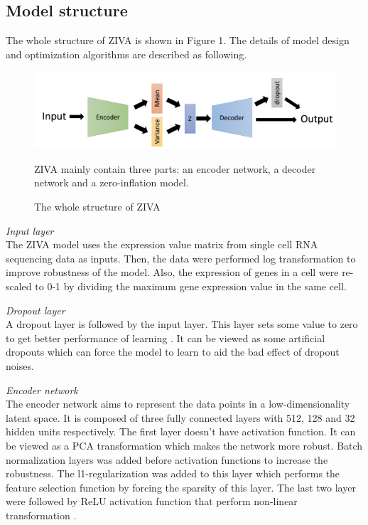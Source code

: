 \subsection{Model structure}
The whole structure of ZIVA is shown in Figure 1. The details of model design and optimization algorithms are described as following. 
\begin{figure}
    \centering
    \includegraphics[width=1\textwidth]{figures/myfigures/ZIVA.png}
    \caption{The whole structure of ZIVA}\label{F:test-a}
    ZIVA mainly contain three parts: an encoder network, a decoder network and a zero-inflation model. 
\end{figure}

\vspace{0.5cm}
\noindent\emph{Input layer} \\ The ZIVA model uses the expression value matrix from single cell RNA sequencing data as inputs. Then, the data were performed log transformation to improve robustness of the model.  Also, the expression of genes in a cell were re-scaled to 0-1 by dividing the maximum gene expression value in the same cell. 

\vspace{0.5cm}
\noindent\emph{Dropout layer} \\ A dropout layer \cite{baldi2013understanding} is followed by the input layer. This layer sets some value to zero to get better performance of learning \cite{vincent2008extracting}. It can be viewed as some artificial dropouts which can force the model to learn to aid the bad effect of dropout noises. 

\vspace{0.5cm}
\noindent\emph{Encoder network} \\
The encoder network aims to represent the data points in a low-dimensionality latent space. It is composed of three fully connected layers with 512, 128 and 32 hidden units respectively. The first layer doesn’t have activation function. It can be viewed as a PCA transformation which makes the network more robust. Batch normalization layers was added before activation functions to increase the robustness. The l1-regularization was added to this layer which performs the feature selection function by forcing the sparsity of this layer. The last two layer were followed by ReLU activation function that perform non-linear transformation \cite{krizhevsky2012imagenet}.

